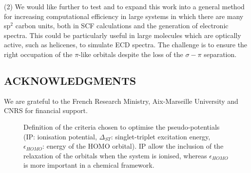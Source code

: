 \documentclass[12pt]{article}
\begin{document}
(2) We would like further to test and to expand this work into a general method for increasing computational efficiency in large systems in
which there are many sp$^{2}$ carbon units, both in SCF calculations and the generation of electronic spectra.
This could be particularly useful in large molecules which are optically active, such as helicenes, to simulate ECD spectra.
The challenge is to ensure the right occupation of the $\pi$-like orbitals despite the loss of the
$\sigma-\pi$ separation.

\subsection*{\sffamily \large ACKNOWLEDGMENTS}
We are grateful to the French Research Ministry, Aix-Marseille University and CNRS for financial support.

\clearpage



%
%



\clearpage

\begin{figure}
\caption{Definition of the criteria chosen to optimise the pseudo-potentials
(IP: ionisation potential, $\Delta_{ST}$: singlet-triplet excitation energy, $\epsilon_{HOMO}$: energy of the HOMO orbital).
IP allow the inclusion of the relaxation of the orbitals when the system is ionised, whereas $\epsilon_{HOMO}$ is more important
in a chemical framework.}
\label{figure:diagram}
\end{figure}
\end{document}
